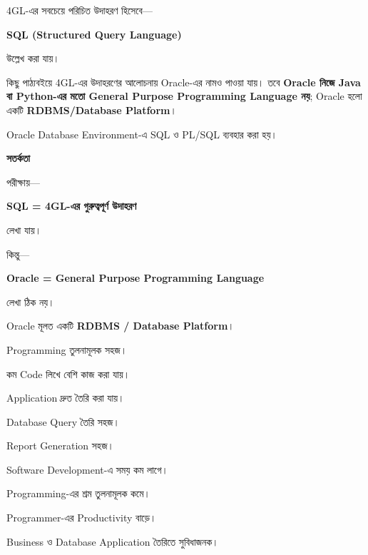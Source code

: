 
4GL-এর সবচেয়ে পরিচিত উদাহরণ হিসেবে—

\begin{center}

\textbf{SQL (Structured Query Language)}

\end{center}

উল্লেখ করা যায়।

কিছু পাঠ্যবইয়ে 4GL-এর উদাহরণের আলোচনায় Oracle-এর নামও পাওয়া যায়।
তবে \textbf{Oracle নিজে Java বা Python-এর মতো General Purpose
Programming Language নয়}; Oracle হলো একটি
\textbf{RDBMS/Database Platform}।

Oracle Database Environment-এ SQL ও PL/SQL ব্যবহার করা হয়।

\begin{rememberbox}

\textbf{\color{deepOrange}সতর্কতা}

পরীক্ষায়—

\textbf{SQL = 4GL-এর গুরুত্বপূর্ণ উদাহরণ}

লেখা যায়।

কিন্তু—

\textbf{Oracle = General Purpose Programming Language}

লেখা ঠিক নয়।

Oracle মূলত একটি \textbf{RDBMS / Database Platform}।

\end{rememberbox}


\begin{compacttwocolpoints}

\item Programming তুলনামূলক সহজ।

\item কম Code লিখে বেশি কাজ করা যায়।

\item Application দ্রুত তৈরি করা যায়।

\item Database Query তৈরি সহজ।

\item Report Generation সহজ।

\item Software Development-এ সময় কম লাগে।

\item Programming-এর শ্রম তুলনামূলক কমে।

\item Programmer-এর Productivity বাড়ে।

\item Business ও Database Application তৈরিতে সুবিধাজনক।

\end{compacttwocolpoints}

